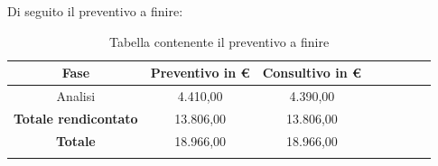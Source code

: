 			Di seguito il preventivo a finire:
			\begin{longtable}{|c|c|c|c|c|c|c|c}
				\hline
				\rowcolor{lighter-grayer}
				\textbf{Fase} & \textbf{Preventivo in €} & \textbf{Consultivo in €} \\
				\hline
				\endfirsthead
				
				\hline
				Analisi & 4.410,00 & 4.390,00\\
				\hline
				\hline
				\textbf{Totale rendicontato} & 13.806,00 & 13.806,00\\
				\hline
				\hline
				\textbf{Totale} & 18.966,00 & 18.966,00\\
				\hline
				\caption{Tabella contenente il preventivo a finire}
			\end{longtable}
			
			
			